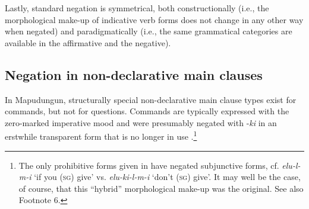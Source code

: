 \documentclass[output=paper,colorlinks,citecolor=brown,draft]{langscibook}
\begin{document}
Lastly, standard negation is symmetrical, both constructionally (i.e., the morphological make-up of indicative verb forms does not change in any other way when negated) and paradigmatically (i.e., the same grammatical categories are available in the affirmative and the negative).

\subsection{Negation in non-declarative main clauses}
\label{sec:mapu:2.2}

In Mapudungun, structurally special non-declarative main clause types exist for commands, but not for questions. Commands are typically expressed with the zero-marked imperative mood  and were presumably negated with -\textit{ki} in an erstwhile transparent form that is no longer in use .\footnote{The only prohibitive forms given in \citet[23a--b]{Valdivia1606} have negated subjunctive forms, cf. \textit{elu-l-m-i} ‘if  you (\textsc{sg}) give’ vs. \textit{elu-ki-l-m-i} ‘don’t (\textsc{sg}) give’. It may well be the case, of course, that this “hybrid” morphological make-up was the original. See also Footnote 6.}

\ea\label{ex:mapu:3}
    \z
\z 
\end{document}
